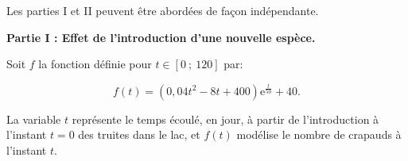 \medskip



Les parties I et II peuvent être abordées de façon indépendante.

\begin{center}\textbf{Partie I : Effet de l'introduction d'une nouvelle espèce.}\end{center}






Soit $f$ la fonction définie pour   $t \in [0~;~120]$ par:

\[f(t) = \left(0,04t^2 - 8t + 400\right)\text{e}^{\frac{t}{50}} + 40.\]

La variable $t$ représente le temps écoulé, en jour, à partir de l'introduction à l'instant $t = 0$ des truites dans le lac, et $f(t)$ modélise le nombre de crapauds à l'instant $t$.

\medskip

